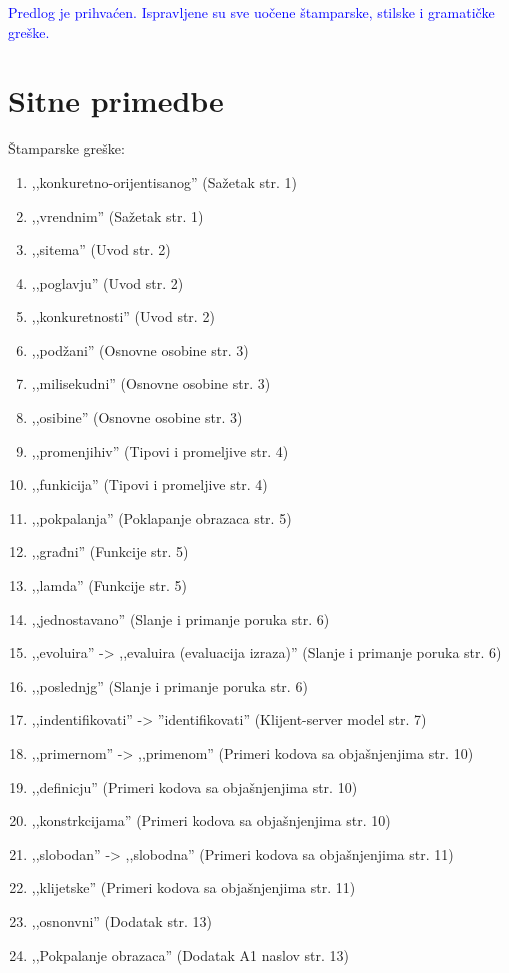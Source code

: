 \documentclass[a4paper]{report}
\newcommand{\odgovor}[1]{\textcolor{blue}{#1}}
\begin{document}
\odgovor{Predlog je prihvaćen. Ispravljene su sve uočene štamparske, stilske i gramatičke greške.}

\section{Sitne primedbe}
Štamparske greške:
\begin{enumerate}
\item ,,konkuretno-orijentisanog'' (Sažetak str. 1)
\item ,,vrendnim'' (Sažetak str. 1)
\item ,,sitema'' (Uvod str. 2)
\item ,,poglavju'' (Uvod str. 2)
\item ,,konkuretnosti'' (Uvod str. 2)
\item ,,podžani'' (Osnovne osobine str. 3)
\item ,,milisekudni'' (Osnovne osobine str. 3)
\item ,,osibine'' (Osnovne osobine str. 3)
\item ,,promenjihiv'' (Tipovi i promeljive str. 4)
\item ,,funkicija'' (Tipovi i promeljive str. 4)
\item ,,pokpalanja'' (Poklapanje obrazaca str. 5)
\item ,,građni'' (Funkcije str. 5)
\item ,,lamda'' (Funkcije str. 5)
\item ,,jednostavano'' (Slanje i primanje poruka str. 6)
\item ,,evoluira'' -> ,,evaluira (evaluacija izraza)'' (Slanje i primanje poruka str. 6)
\item ,,poslednjg'' (Slanje i primanje poruka str. 6)
\item ,,indentifikovati'' -> ''identifikovati'' (Klijent-server model str. 7)
\item ,,primernom'' -> ,,primenom'' (Primeri kodova sa objašnjenjima str. 10)
\item ,,definicju'' (Primeri kodova sa objašnjenjima str. 10)
\item ,,konstrkcijama'' (Primeri kodova sa objašnjenjima str. 10)
\item ,,slobodan'' -> ,,slobodna'' (Primeri kodova sa objašnjenjima str. 11)
\item ,,klijetske'' (Primeri kodova sa objašnjenjima str. 11)
\item ,,osnonvni'' (Dodatak str. 13)
\item ,,Pokpalanje obrazaca'' (Dodatak A1 naslov str. 13) 
\end{enumerate}
\end{document}
